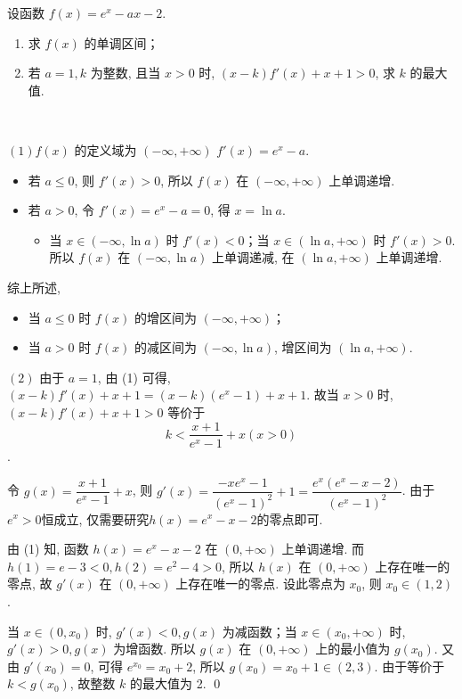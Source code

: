 \begin{example}[2012课标全国卷]
    设函数 $f(x) = e^x - ax - 2$.

\begin{enumerate}
    \item 求 $f(x)$ 的单调区间；
    \item 若 $a = 1, k$ 为整数, 且当 $x > 0$ 时, $(x-k)f'(x) + x + 1 > 0$, 求 $k$ 的最大值. 
\end{enumerate}
\end{example}

\begin{jie}
\ 


\((1)\)$f(x)$ 的定义域为 $(-\infty, +\infty)$ $f'(x) = e^x - a$. 
        \begin{itemize}
            \item 若 $a \leq 0$, 则 $f'(x) > 0$, 所以 $f(x)$ 在 $(-\infty, +\infty)$ 上单调递增. 
            \item 若 $a > 0$, 令 $f'(x) = e^x - a = 0$, 得 $x = \ln a$. 
            \begin{itemize}
                \item 当 $x \in (-\infty, \ln a)$ 时 $f'(x) < 0$；当 $x \in (\ln a, +\infty)$ 时 $f'(x) > 0$. 所以 $f(x)$ 在 $(-\infty, \ln a)$ 上单调递减, 在 $(\ln a, +\infty)$ 上单调递增. 
            \end{itemize}
        \end{itemize}
        综上所述, 
        \begin{itemize}
            \item 当 $a \leq 0$ 时 $f(x)$ 的增区间为 $(-\infty, +\infty)$；
            \item 当 $a > 0$ 时 $f(x)$ 的减区间为 $(-\infty, \ln a)$, 增区间为 $(\ln a, +\infty)$. 
        \end{itemize}

\((2)\)  
由于 $a = 1$, 由 (1) 可得, $(x-k)f'(x) + x + 1 = (x-k)(e^x - 1) + x + 1$. 
故当 $x > 0$ 时, $(x-k)f'(x) + x + 1 > 0$ 等价于 $$k < \frac{x+1}{e^x - 1} + x (x > 0)$$. 

 令 $g(x) = \dfrac{x+1}{e^x - 1} + x$, 则 $g'(x) = \dfrac{-xe^x - 1}{(e^x - 1)^2} + 1 = \dfrac{e^x(e^x - x - 2)}{(e^x - 1)^2}$. 
 由于\(e^x>0\)恒成立, 仅需要研究\(h(x) = e^x - x - 2\)的零点即可. 
 
 由 (1) 知, 函数 $h(x) = e^x - x - 2$ 在 $(0, +\infty)$ 上单调递增. 
而 $h(1) = e - 3 < 0, h(2) = e^2 - 4 > 0$, 所以 $h(x)$ 在 $(0, +\infty)$ 上存在唯一的零点, 故 $g'(x)$ 在 $(0, +\infty)$ 上存在唯一的零点. 
 设此零点为 $x_0$, 则 $x_0 \in (1, 2)$. 

当 $x \in (0, x_0)$ 时, $g'(x) < 0, g(x)$ 为减函数；当 $x \in (x_0, +\infty)$ 时, $g'(x) > 0, g(x)$ 为增函数. 
 所以 $g(x)$ 在 $(0, +\infty)$ 上的最小值为 $g(x_0)$. 
 又由 $g'(x_0) = 0$, 可得 $e^{x_0} = x_0 + 2$, 所以 $g(x_0) = x_0 + 1 \in (2, 3)$. 
由于等价于 $k < g(x_0)$, 故整数 $k$ 的最大值为 2. 
\qed
\end{jie}
